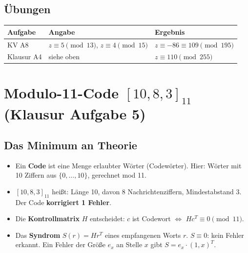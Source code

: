 \subsection*{Übungen}
\begin{tabular}{@{}lll@{}}
\toprule
Aufgabe & Angabe & Ergebnis\\
\midrule
KV A8 & $z \equiv 5 \pmod{13}$, $z \equiv 4 \pmod{15}$ & $z \equiv -86 \equiv 109 \pmod{195}$\\
Klausur A4 & siehe oben & $z \equiv 110 \pmod{255}$\\
\bottomrule
\end{tabular}

\section{Modulo-11-Code $[10, 8, 3]_{11}$ (Klausur Aufgabe 5)}
\subsection*{Das Minimum an Theorie}
\begin{itemize}
\item Ein \textbf{Code} ist eine Menge erlaubter Wörter (Codewörter). Hier: Wörter mit 10 Ziffern aus $\{0, \dots, 10\}$, gerechnet mod 11.
\item $[10, 8, 3]_{11}$ heißt: Länge 10, davon 8 Nachrichtenziffern, Mindestabstand 3. Der Code \textbf{korrigiert 1 Fehler}.
\item Die \textbf{Kontrollmatrix} $H$ entscheidet: $c$ ist Codewort $\Leftrightarrow$ $H c^T \equiv 0 \pmod{11}$.
\item Das \textbf{Syndrom} $S(r) = H r^T$ eines empfangenen Worts $r$. $S \equiv 0$: kein Fehler erkannt.
      Ein Fehler der Größe $e_x$ an Stelle $x$ gibt $S = e_x \cdot (1, x)^T$.
\end{itemize}


